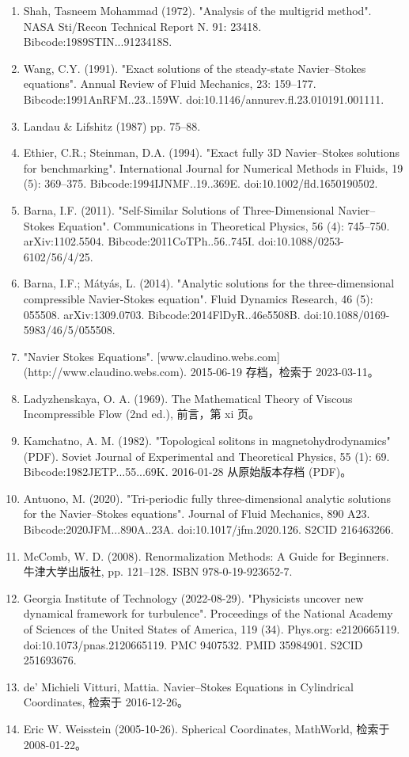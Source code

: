 \begin{enumerate}
\item Shah, Tasneem Mohammad (1972). "Analysis of the multigrid method". NASA Sti/Recon Technical Report N. 91: 23418. Bibcode:1989STIN...9123418S.
\item Wang, C.Y. (1991). "Exact solutions of the steady-state Navier–Stokes equations". Annual Review of Fluid Mechanics, 23: 159–177. Bibcode:1991AnRFM..23..159W. doi:10.1146/annurev.fl.23.010191.001111.
\item Landau & Lifshitz (1987) pp. 75–88.
\item Ethier, C.R.; Steinman, D.A. (1994). "Exact fully 3D Navier–Stokes solutions for benchmarking". International Journal for Numerical Methods in Fluids, 19 (5): 369–375. Bibcode:1994IJNMF..19..369E. doi:10.1002/fld.1650190502.
\item Barna, I.F. (2011). "Self-Similar Solutions of Three-Dimensional Navier–Stokes Equation". Communications in Theoretical Physics, 56 (4): 745–750. arXiv:1102.5504. Bibcode:2011CoTPh..56..745I. doi:10.1088/0253-6102/56/4/25.
\item Barna, I.F.; Mátyás, L. (2014). "Analytic solutions for the three-dimensional compressible Navier-Stokes equation". Fluid Dynamics Research, 46 (5): 055508. arXiv:1309.0703. Bibcode:2014FlDyR..46e5508B. doi:10.1088/0169-5983/46/5/055508.
\item "Navier Stokes Equations". [www.claudino.webs.com](http://www.claudino.webs.com). 2015-06-19 存档，检索于 2023-03-11。
\item Ladyzhenskaya, O. A. (1969). The Mathematical Theory of Viscous Incompressible Flow (2nd ed.), 前言，第 xi 页。
\item Kamchatno, A. M. (1982). "Topological solitons in magnetohydrodynamics" (PDF). Soviet Journal of Experimental and Theoretical Physics, 55 (1): 69. Bibcode:1982JETP...55...69K. 2016-01-28 从原始版本存档 (PDF)。
\item Antuono, M. (2020). "Tri-periodic fully three-dimensional analytic solutions for the Navier–Stokes equations". Journal of Fluid Mechanics, 890 A23. Bibcode:2020JFM...890A..23A. doi:10.1017/jfm.2020.126. S2CID 216463266.
\item McComb, W. D. (2008). Renormalization Methods: A Guide for Beginners. 牛津大学出版社, pp. 121–128. ISBN 978-0-19-923652-7.
\item Georgia Institute of Technology (2022-08-29). "Physicists uncover new dynamical framework for turbulence". Proceedings of the National Academy of Sciences of the United States of America, 119 (34). Phys.org: e2120665119. doi:10.1073/pnas.2120665119. PMC 9407532. PMID 35984901. S2CID 251693676.
\item de' Michieli Vitturi, Mattia. Navier–Stokes Equations in Cylindrical Coordinates, 检索于 2016-12-26。
\item Eric W. Weisstein (2005-10-26). Spherical Coordinates, MathWorld, 检索于 2008-01-22。
\end{enumerate}

